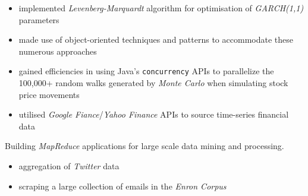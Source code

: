 \documentclass[letterpaper,11pt]{article}
\begin{document}
\begin{description}[style=multiline,leftmargin=3cm]
	      \begin{itemize}
		      \item implemented \textit{Levenberg-Marquardt} algorithm for optimisation of \textit{GARCH(1,1)} parameters
		      \item made use of object-oriented techniques and patterns to accommodate these numerous approaches
		      \item gained efficiencies in using Java's \texttt{concurrency} APIs to parallelize the 100,000+ random walks generated by \textit{Monte Carlo} when simulating stock price movements
		      \item utilised \textit{Google Fiance}/\textit{Yahoo Finance} APIs to source time-series financial data
	      \end{itemize}
	\item[Data Mining \textnormal{\tiny\href{https://github.com/Adrian-Ng/HadoopEnron}{adrian.ng/java/enron}}] Building \textit{MapReduce} applications for large scale data mining and processing.
	      \begin{description}[style=multiline,leftmargin=3.2cm]
		      \item[MapReduce]
		            \begin{itemize}
			            \item aggregation of \textit{Twitter} data
			            \item scraping a large collection of emails in the \textit{Enron Corpus}

\end{itemize}
\end{description}
\end{description}
\end{document}

